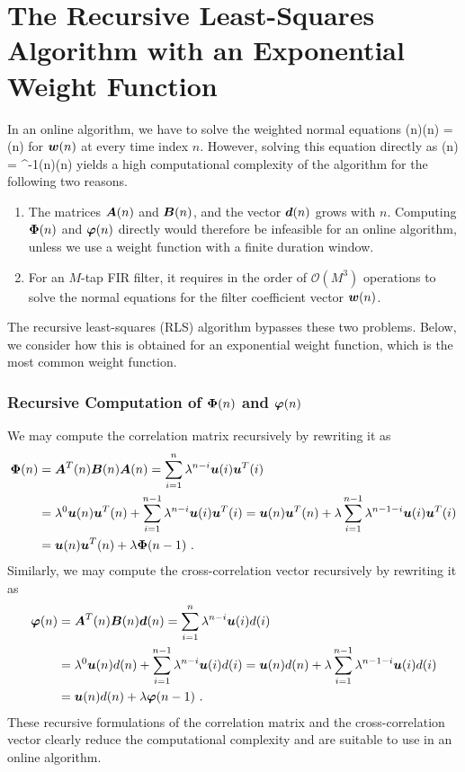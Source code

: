 \section{The Recursive Least-Squares Algorithm with an Exponential Weight Function}
In an online algorithm, we have to solve the weighted normal equations
\bmath
  \vect{\Phi}(n)(n) = \vect{\varphi}(n)
\emath
for $\boldsymbol{w}(n)$ at every time index $n$. However, solving this equation directly as
\bmath
  (n) = \vect{\Phi}^{-1}(n)\vect{\varphi}(n)
\emath
yields a high computational complexity of the algorithm for the following two reasons.
\begin{enumerate}
  \item The matrices $\boldsymbol{A}(n)$ and $\boldsymbol{B}(n)$, and the vector $\boldsymbol{d}(n)$ grows with $n$. Computing $\boldsymbol{\Phi}(n)$ and $\boldsymbol{\varphi}(n)$ directly would therefore be infeasible for an online algorithm, unless we use a weight function with a finite duration window.
  \item For an $M$-tap FIR filter, it requires in the order of $\mathcal{O}(M^3)$ operations to solve the normal equations for the filter coefficient vector $\boldsymbol{w}(n)$.
\end{enumerate}
The recursive least-squares (RLS) algorithm bypasses these two problems. Below, we consider how this is obtained for an exponential weight function, which is the most common weight function.

\subsubsection{Recursive Computation of $\boldsymbol{\Phi}(n)$ and $\boldsymbol{\varphi}(n)$}
We may compute the correlation matrix recursively by rewriting it as
\begin{align}
  \boldsymbol{\Phi}(n) &= \boldsymbol{A}^T(n)\boldsymbol{B}(n)\boldsymbol{A}(n) = \sum_{i=1}^{n}\lambda^{n-i}\boldsymbol{u}(i)\boldsymbol{u}^T(i)\\
  &= \lambda^0 \boldsymbol{u}(n)\boldsymbol{u}^T(n) + \sum_{i=1}^{n-1}\lambda^{n-i}\boldsymbol{u}(i)\boldsymbol{u}^T(i) = \boldsymbol{u}(n)\boldsymbol{u}^T(n) + \lambda\sum_{i=1}^{n-1}\lambda^{n-1-i}\boldsymbol{u}(i)\boldsymbol{u}^T(i)\notag\\
  &= \boldsymbol{u}(n)\boldsymbol{u}^T(n) + \lambda\boldsymbol{\Phi}(n-1)\ .
  \label{eq:rls_corr_recurs}
\end{align}
Similarly, we may compute the cross-correlation vector recursively by rewriting it as
\begin{align}
  \boldsymbol{\varphi}(n) &= \boldsymbol{A}^T(n)\boldsymbol{B}(n)\boldsymbol{d}(n) = \sum_{i=1}^{n}\lambda^{n-i}\boldsymbol{u}(i)d(i)\\
  &= \lambda^0 \boldsymbol{u}(n)d(n) + \sum_{i=1}^{n-1}\lambda^{n-i}\boldsymbol{u}(i)d(i) = \boldsymbol{u}(n)d(n) + \lambda\sum_{i=1}^{n-1}\lambda^{n-1-i}\boldsymbol{u}(i)d(i)\notag\\
  &= \boldsymbol{u}(n)d(n) + \lambda\boldsymbol{\varphi}(n-1)\ .
\end{align}
These recursive formulations of the correlation matrix and the cross-correlation vector clearly reduce the computational complexity and are suitable to use in an online algorithm.

